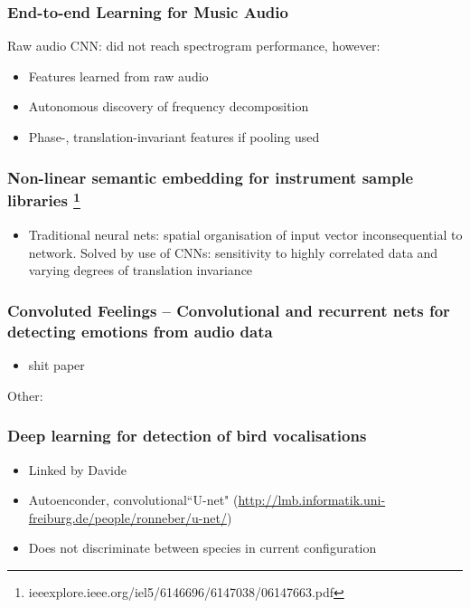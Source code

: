 \documentclass[12pt]{llncs}
\begin{document}
\subsubsection*{End-to-end Learning for Music Audio \cite{dieleman2014end}}
Raw audio CNN: did not reach spectrogram performance, however:
\begin{itemize}
	\item Features learned from raw audio
	\item Autonomous discovery of frequency decomposition
	\item Phase-, translation-invariant features if pooling used
\end{itemize}



\subsubsection*{Non-linear semantic embedding for instrument sample libraries \cite{humphrey2011non} \footnote{ieeexplore.ieee.org/iel5/6146696/6147038/06147663.pdf}}
\begin{itemize}
	\item Traditional neural nets: spatial organisation of input vector inconsequential to network. Solved by use of CNNs: sensitivity to highly correlated data and varying degrees of translation invariance
\end{itemize}




\subsubsection*{Convoluted Feelings -- Convolutional and recurrent nets for detecting emotions from audio data \cite{anandconvoluted}}
\begin{itemize}
	\item shit paper
\end{itemize}


Other:

\subsubsection*{Deep learning for detection of bird vocalisations \cite{potamitis2016deep}}
\begin{itemize}
	\item Linked by Davide 

	\item Autoenconder, convolutional``U-net" (\url{http://lmb.informatik.uni-freiburg.de/people/ronneber/u-net/})
	\item Does not discriminate between species in current configuration
\end{itemize}
	
\end{document}
